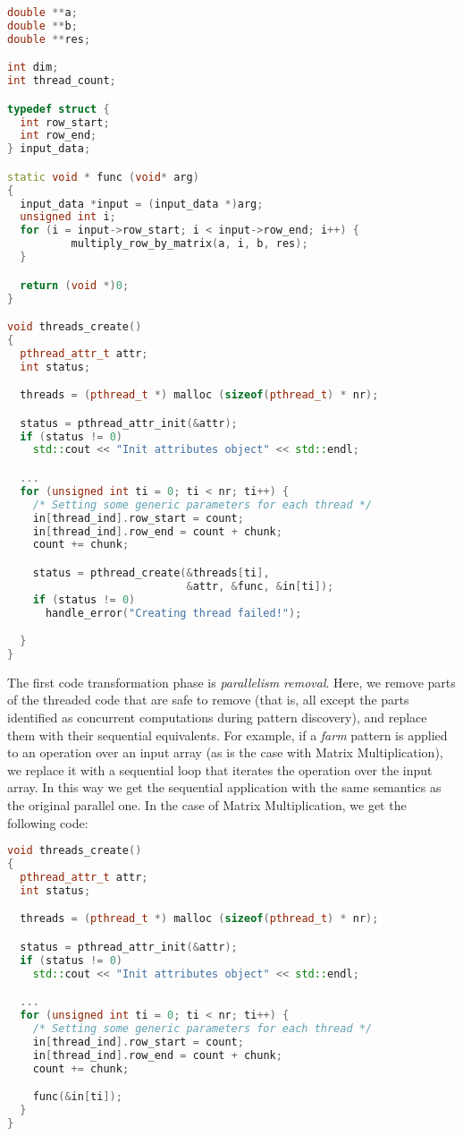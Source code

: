 \documentclass{llncs}
\begin{document}
\begin{lstlisting}[linewidth=\columnwidth,language=C++,basicstyle=\tiny]
double **a;
double **b;
double **res;

int dim;
int thread_count;

typedef struct {
  int row_start;
  int row_end;
} input_data;

static void * func (void* arg)
{
  input_data *input = (input_data *)arg;
  unsigned int i;
  for (i = input->row_start; i < input->row_end; i++) {
          multiply_row_by_matrix(a, i, b, res);
  }

  return (void *)0;
}

void threads_create()
{
  pthread_attr_t attr;
  int status;

  threads = (pthread_t *) malloc (sizeof(pthread_t) * nr);

  status = pthread_attr_init(&attr);
  if (status != 0)
    std::cout << "Init attributes object" << std::endl;

  ...
  for (unsigned int ti = 0; ti < nr; ti++) {
    /* Setting some generic parameters for each thread */
    in[thread_ind].row_start = count;
    in[thread_ind].row_end = count + chunk;
    count += chunk;

    status = pthread_create(&threads[ti], 
                            &attr, &func, &in[ti]);
    if (status != 0)
      handle_error("Creating thread failed!");

  }
}
    \end{lstlisting}
    
    
  
  The first code transformation phase is \emph{parallelism removal}. Here, we remove parts of the threaded code  that are safe to remove (that is, all except the parts identified as concurrent computations during pattern discovery), and replace them with their sequential equivalents. For example, if a \emph{farm} pattern is applied to an operation over an input array (as is the case with Matrix Multiplication), we replace it with a  sequential loop that iterates the operation over the input array. In this way we get the sequential application with the same semantics as the original parallel one. In the case of Matrix Multiplication, we get the following code:
    
\begin{lstlisting}[linewidth=\columnwidth,language=C++,basicstyle=\tiny]
void threads_create()
{
  pthread_attr_t attr;
  int status;   

  threads = (pthread_t *) malloc (sizeof(pthread_t) * nr);

  status = pthread_attr_init(&attr);
  if (status != 0)
    std::cout << "Init attributes object" << std::endl;

  ...
  for (unsigned int ti = 0; ti < nr; ti++) {
    /* Setting some generic parameters for each thread */
    in[thread_ind].row_start = count;
    in[thread_ind].row_end = count + chunk;
    count += chunk;

    func(&in[ti]);
  }
}
\end{lstlisting}
\end{document}
